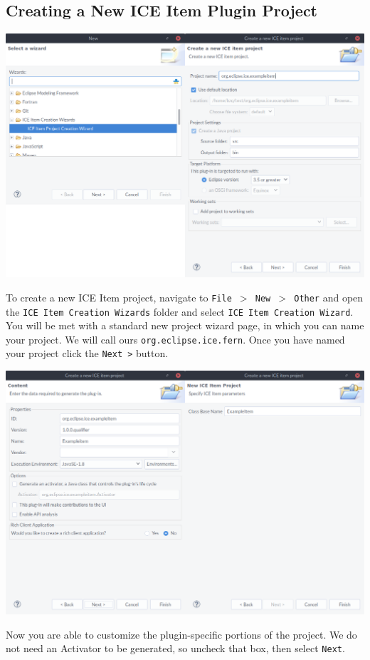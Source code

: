 \subsection*{Creating a New ICE Item Plugin Project}
\begin{center} \includegraphics[width=\textwidth]{figures/comb12} \end{center}

To create a new ICE Item project, navigate to \texttt{File $>$ New $>$ Other}
and open the \texttt{ICE Item Creation Wizards} folder and 
select \texttt{ICE Item Creation Wizard}. You will be met with a standard new
project wizard page, in which you can name your project.  We will call ours
\texttt{org.eclipse.ice.fern}. Once you have named your project click the \texttt{Next >} button.
\begin{center} \includegraphics[width=\textwidth]{figures/comb23} \end{center}
Now you are able to customize the plugin-specific portions of the project. We do
not need an Activator to be generated, so uncheck that box, then select
\texttt{Next}. 

